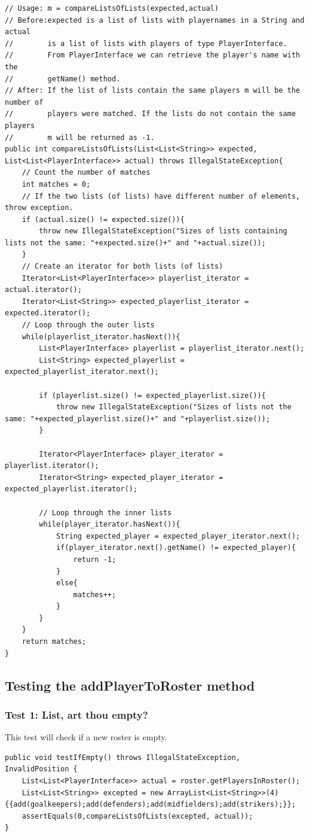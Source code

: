 \documentclass{article}
\begin{document}
\begin{lstlisting}
// Usage: m = compareListsOfLists(expected,actual)
// Before:expected is a list of lists with playernames in a String and actual
//        is a list of lists with players of type PlayerInterface.
//        From PlayerInterface we can retrieve the player's name with the
//        getName() method.
// After: If the list of lists contain the same players m will be the number of
//        players were matched. If the lists do not contain the same players
//        m will be returned as -1.
public int compareListsOfLists(List<List<String>> expected, List<List<PlayerInterface>> actual) throws IllegalStateException{
	// Count the number of matches
	int matches = 0;
	// If the two lists (of lists) have different number of elements, throw exception.
	if (actual.size() != expected.size()){
		throw new IllegalStateException("Sizes of lists containing lists not the same: "+expected.size()+" and "+actual.size());
	}
	// Create an iterator for both lists (of lists)
	Iterator<List<PlayerInterface>> playerlist_iterator = actual.iterator();
	Iterator<List<String>> expected_playerlist_iterator = expected.iterator();
	// Loop through the outer lists
	while(playerlist_iterator.hasNext()){
		List<PlayerInterface> playerlist = playerlist_iterator.next();
		List<String> expected_playerlist = expected_playerlist_iterator.next();
		
		if (playerlist.size() != expected_playerlist.size()){
			throw new IllegalStateException("Sizes of lists not the same: "+expected_playerlist.size()+" and "+playerlist.size());
		}
		
		Iterator<PlayerInterface> player_iterator = playerlist.iterator();
		Iterator<String> expected_player_iterator = expected_playerlist.iterator();
		
		// Loop through the inner lists
		while(player_iterator.hasNext()){
			String expected_player = expected_player_iterator.next();
			if(player_iterator.next().getName() != expected_player){
				return -1;
			}
			else{
				matches++;
			}
		}
	}
	return matches;
}
\end{lstlisting}

\subsection{Testing the addPlayerToRoster method}
\subsubsection{Test 1: List, art thou empty?}
This test will check if a new roster is empty.
\begin{lstlisting}
public void testIfEmpty() throws IllegalStateException, InvalidPosition {
	List<List<PlayerInterface>> actual = roster.getPlayersInRoster();
	List<List<String>> excepted = new ArrayList<List<String>>(4) {{add(goalkeepers);add(defenders);add(midfielders);add(strikers);}};
	assertEquals(0,compareListsOfLists(excepted, actual));
}
\end{lstlisting}
\end{document}
